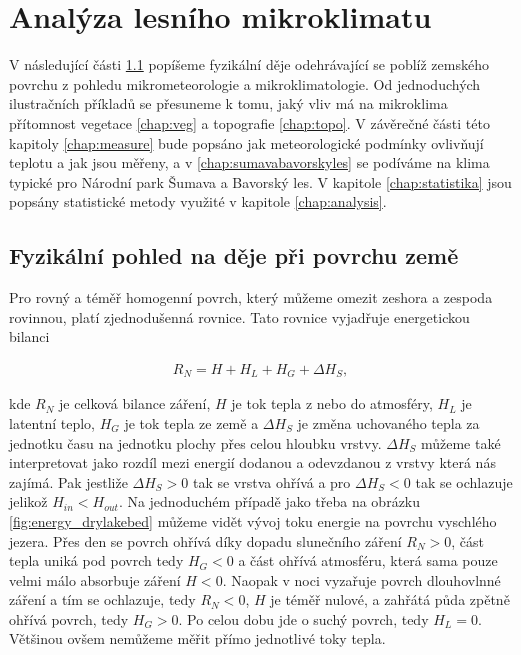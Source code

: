 \chapter{Analýza lesního mikroklimatu}
\label{chap:ch1}

V následující části \ref{chap:fyz} popíšeme fyzikální děje odehrávající se poblíž zemského povrchu z pohledu mikrometeorologie a mikroklimatologie. Od jednoduchých ilustračních příkladů se přesuneme k tomu, jaký vliv má na mikroklima přítomnost vegetace \ref{chap:veg} a topografie \ref{chap:topo}. V závěrečné části této kapitoly \ref{chap:measure} bude popsáno jak meteorologické podmínky ovlivňují teplotu a jak jsou měřeny, a v \ref{chap:sumavabavorskyles} se podíváme na klima typické pro Národní park Šumava a Bavorský les. V kapitole \ref{chap:statistika} jsou popsány statistické metody využité v kapitole \ref{chap:analysis}.

\section{Fyzikální pohled na děje při povrchu země} \label{chap:fyz}
Pro rovný a téměř homogenní povrch, který můžeme omezit zeshora a zespoda rovinnou, platí zjednodušenná rovnice. Tato rovnice vyjadřuje energetickou bilanci\cite{arya2001}

\begin{gather}\label{eq:bilance}
R_N = H + H_L + H_G + \Delta H_S,
\end{gather}

kde $R_N$ je celková bilance záření, $H$ je tok tepla z nebo do atmosféry, $H_L$ je latentní teplo, $H_G$ je tok tepla ze země a $\Delta H_S$ je změna uchovaného tepla za jednotku času na jednotku plochy přes celou hloubku vrstvy. $\Delta H_S$ můžeme také interpretovat jako rozdíl mezi energií dodanou a odevzdanou z vrstvy která nás zajímá. Pak jestliže $\Delta H_S>0$ tak se vrstva ohřívá a pro $\Delta H_S<0$ tak se ochlazuje jelikož $H_{in}<H_{out}$. Na jednoduchém případě jako třeba na obrázku \ref{fig:energy_drylakebed} můžeme vidět vývoj toku energie na povrchu vyschlého jezera. Přes den se povrch ohřívá díky dopadu slunečního záření $R_N>0$, část tepla uniká pod povrch tedy $H_G<0$ a část ohřívá atmosféru, která sama pouze velmi málo absorbuje záření $H<0$. Naopak v noci vyzařuje povrch dlouhovlnné záření a tím se ochlazuje, tedy $R_N<0$, $H$ je téměř nulové, a zahřátá půda zpětně ohřívá povrch, tedy $H_G>0$. Po celou dobu jde o suchý povrch, tedy $H_L=0$\cite{arya2001}. Většinou ovšem nemůžeme měřit přímo jednotlivé toky tepla.

